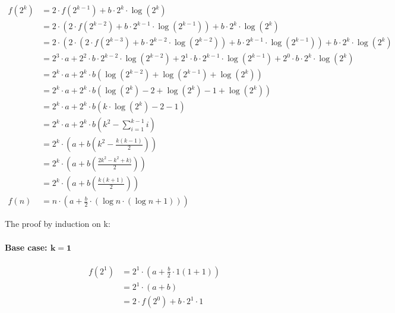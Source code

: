 \documentclass{article}
\begin{document}
\begin{enumerate}
{\begin{enumerate}[label={(\arabic*)}]
{\begin{align*}
                        f(2^k) 
                        &= 2\cdot f(2^{k-1}) + b\cdot 2^k\cdot \log(2^k) \\
                        &= 2\cdot \left(2\cdot f(2^{k-2}) + b\cdot 2^{k-1}\cdot \log(2^{k-1})\right) + b\cdot 2^k\cdot \log(2^k) \\
                        &= 2\cdot \left(2\cdot \left(2\cdot f(2^{k-3}) + b\cdot 2^{k-2}\cdot \log(2^{k-2})\right) + b\cdot 2^{k-1}\cdot \log(2^{k-1})\right) + b\cdot 2^k\cdot \log(2^k) \\
                        &= 2^3\cdot a + 2^2\cdot b\cdot2^{k-2}\cdot\log(2^{k-2}) + 2^1\cdot b\cdot2^{k-1}\cdot\log(2^{k-1}) + 2^0\cdot b\cdot2^k\cdot\log(2^k) \\
                        &= 2^k\cdot a + 2^k\cdot b\left(\log(2^{k-2}) + \log(2^{k-1}) + \log(2^k)\right) \\
                        &= 2^k\cdot a + 2^k\cdot b\left(\log(2^k) - 2 + \log(2^k) - 1 + \log(2^k)\right) \\
                        &= 2^k\cdot a + 2^k\cdot b\left(k\cdot\log(2^k) - 2 - 1\right) \\
                        &= 2^k\cdot a + 2^k\cdot b\left(k^2 - \sum_{i=1}^{k-1}i\right) \\
                        &= 2^k\cdot \left(a + b\left(k^2 - \frac{k(k-1)}{2}\right)\right) \\
                        &= 2^k\cdot \left(a + b\left(\frac{2k^2-k^2+k)}{2}\right)\right) \\
                        &= 2^k\cdot \left(a + b\left(\frac{k(k+1)}{2}\right)\right) \\
                        f(n) &= n\cdot\left(a+\frac{b}{2}\cdot\left(\log n\cdot(\log n+1)\right)\right)
                    \end{align*}

                    The proof by induction on k:

                    \paragraph*{Base case: \(\mathbf{k = 1}\)}
                    \begin{displaymath}
                        \begin{aligned}
                            f(2^1) 
                            &= 2^1\cdot\left( a + \frac{b}{2}\cdot1(1+1) \right) \\ 
                            &= 2^1\cdot\left(a + b\right) \\
                            &= 2\cdot f(2^0) + b\cdot2^1\cdot1
                        \end{aligned}
                    \end{displaymath}
}
\end{enumerate}}
\end{enumerate}
\end{document}
